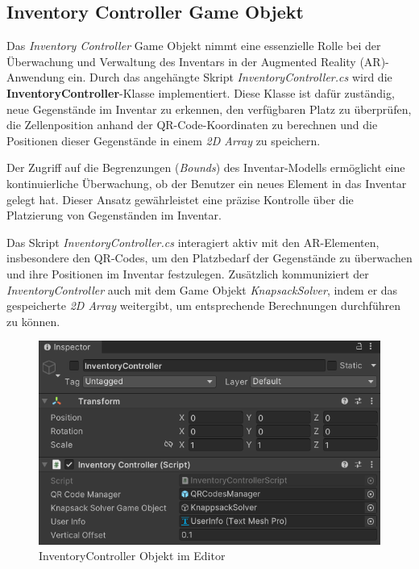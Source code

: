 \subsection{Inventory Controller Game Objekt}
Das \textit{Inventory Controller} Game Objekt nimmt eine essenzielle Rolle bei der Überwachung und Verwaltung des Inventars
in der Augmented Reality (AR)-Anwendung ein. Durch das angehängte Skript \textit{InventoryController.cs} wird die
\textbf{InventoryController}-Klasse implementiert. Diese Klasse ist dafür zuständig, neue Gegenstände im Inventar zu
erkennen, den verfügbaren Platz zu überprüfen, die Zellenposition anhand der QR-Code-Koordinaten zu berechnen und die
Positionen dieser Gegenstände in einem \textit{2D Array} zu speichern.

Der Zugriff auf die Begrenzungen (\textit{Bounds}) des Inventar-Modells ermöglicht eine kontinuierliche Überwachung, ob
der Benutzer ein neues Element in das Inventar gelegt hat. Dieser Ansatz gewährleistet eine präzise Kontrolle über die
Platzierung von Gegenständen im Inventar.

Das Skript \textit{InventoryController.cs} interagiert aktiv mit den AR-Elementen, insbesondere den QR-Codes, um den
Platzbedarf der Gegenstände zu überwachen und ihre Positionen im Inventar festzulegen. Zusätzlich kommuniziert der
\textit{InventoryController} auch mit dem Game Objekt \textit{KnapsackSolver}, indem er das gespeicherte \textit{2D Array}
weitergibt, um entsprechende Berechnungen durchführen zu können.

\begin{figure}[H]
    \centering
    \includegraphics[scale=0.8]{images/invCon_Editor}
    \caption{InventoryController Objekt im Editor}
    \label{fig:InventoryController_Editor}
\end{figure}

